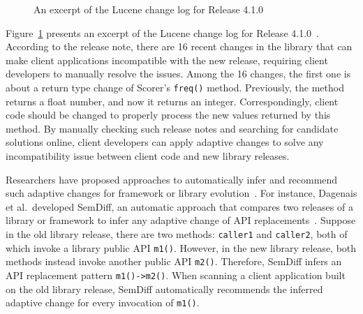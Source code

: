 \documentclass[runningheads,a4paper]{llncs}
\newcommand{\codefont}[1]{\footnotesize{\texttt{#1}}\normalsize}
\begin{document}
\begin{figure}
\centering
{}
\caption{An excerpt of the Lucene change log for Release 4.1.0~\cite{releasenote}}
\label{fig:releasenote}
\end{figure}

Figure~\ref{fig:releasenote} presents an excerpt of the Lucene change log for Release 4.1.0~\cite{releasenote}. According to the release note, there are 16 recent changes in the library that can make client applications incompatible with the new release, requiring client developers to manually resolve the issues. Among the 16 changes, the first one is about a return type change of Scorer's \codefont{freq()} method. Previously, the method returns a float number, and now it returns an integer. Correspondingly, client code should be changed to properly process the new values returned by this method. By manually checking such release notes and searching for candidate solutions online, client developers can apply adaptive changes to solve any incompatibility issue between client code and new library releases.

Researchers have proposed approaches to automatically infer and recommend such adaptive changes for framework or library evolution~\cite{Dagenais2008:RAC,Schafer2008:MFU,Zhong2009:MMR,Wu2010:AHA,Nguyen2010:GAA}. For instance, Dagenais et al.~developed SemDiff, an automatic approach that compares two releases of a library or framework to infer any adaptive change of API replacements~\cite{Dagenais2008:RAC}. Suppose in the old library release, there are two methods: \codefont{caller1} and \codefont{caller2}, both of which invoke a library public API \codefont{m1()}. However, in the new library release, both methods instead invoke another public API \codefont{m2()}. Therefore, SemDiff infers an API replacement pattern \codefont{m1()->m2()}. When scanning a client application built on the old library release, SemDiff automatically recommends the inferred adaptive change for every invocation of \codefont{m1()}.
\end{document}
